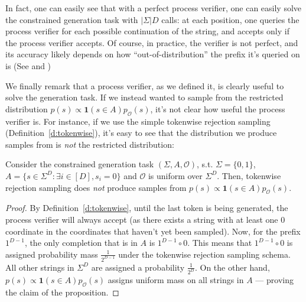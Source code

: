 In fact, one can easily see that with a perfect process verifier, one can easily solve the constrained generation task with $|\Sigma| D$ calls: at each position, one queries the process verifier for each possible continuation of the string, and accepts only if the process verifier accepts. Of course, in practice, the verifier is not perfect, and its accuracy likely depends on how ``out-of-distribution'' the prefix it's queried on is
(See  and )

We finally remark that a process verifier, as we defined it, is clearly useful to solve the generation task. If we instead wanted to sample from the restricted distribution $p(s) \propto \mathbf{1}(s \in A)p_{\mathcal{O}}(s)$, it's not clear how useful the process verifier is. For instance, if we use the simple tokenwise rejection sampling (Definition~\ref{d:tokenwise}), it's easy to see that the distribution we produce samples from is \emph{not} the restricted distribution:

\begin{proposition}
\label{prop:calibration_is_hard}
Consider the constrained generation task $(\Sigma, A, \mathcal{O})$, s.t. $\Sigma = \{0,1\}$, $A = \{s \in \Sigma^D: \exists i \in [D], s_i = 0\}$ and $\mathcal{O}$ is uniform over $\Sigma^D$. Then, tokenwise rejection sampling does \emph{not} produce samples from $p(s) \propto \mathbf{1}(s \in A)p_{\mathcal{O}}(s)$.      
\end{proposition}

\begin{proof}
By Definition~\ref{d:tokenwise}, until the last token is being generated, the process verifier will always accept (as there exists a string with at least one 0 coordinate in the coordinates that haven't yet been sampled). Now, for the prefix $1^{D-1}$, the only completion that is in $A$ is $1^{D-1} \circ 0$. This means that $1^{D-1} \circ 0$ is assigned probability mass $\frac{1}{2^{D-1}}$ under the tokenwise rejection sampling schema. All other strings in $\Sigma^D$ are assigned a probability $\frac{1}{2^D}$. On the other hand, $p(s) \propto \mathbf{1}(s \in A)p_{\mathcal{O}}(s)$ assigns uniform mass on all strings in $A$ --- proving the claim of the proposition.     
\end{proof}

